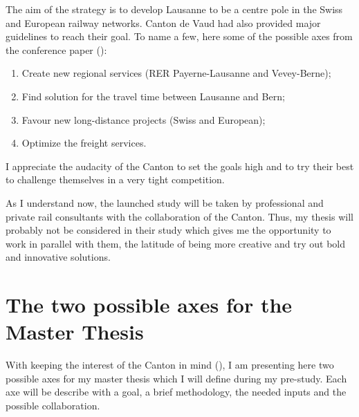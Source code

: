 \documentclass[helv,dvipsnames]{apa7}
\begin{document}
The aim of the strategy is to develop Lausanne to be a centre pole in the Swiss and European railway networks. Canton de Vaud had also provided major guidelines to reach their goal. To name a few, here some of the possible axes from the conference paper (\cite{confvaud2050}):
\begin{enumerate}
    \itemsep0mm
    \item Create new regional services (RER Payerne-Lausanne and Vevey-Berne);
    \item Find solution for the travel time between Lausanne and Bern;
    \item Favour new  long-distance projects (Swiss and European);
    \item Optimize the freight services.
\end{enumerate}
I appreciate the audacity of the Canton to set the goals high and to try their best to challenge themselves in a very tight competition.
\par As I understand now, the launched study will be taken by professional and private rail consultants with the collaboration of the Canton. Thus, my thesis will probably not be considered in their study which gives me the opportunity to work in parallel with them, the latitude of being more creative and try out bold and innovative solutions.
\newpage
\section{The two possible axes for the Master Thesis}
With keeping the interest of the Canton in mind (\cite{vaud2050}), I am presenting here two possible axes for my master thesis which I will define during my pre-study. Each axe will be describe with a goal, a brief methodology, the needed inputs and the possible collaboration.
\end{document}

